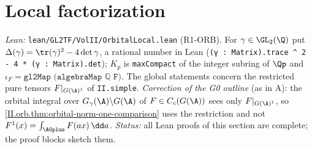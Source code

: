 \section{Local factorization}\label{sec:orb-local}

\noindent\emph{Lean:} \texttt{lean/GL2TF/VolII/OrbitalLocal.lean} (R1-ORB). For $\gamma\in\GL_2(\Q)$ put $\Delta(\gamma)=\tr(\gamma)^2-4\det\gamma$, a rational number in Lean (\texttt{(γ : Matrix).trace \^{} 2 - 4 * (γ : Matrix).det}); $K_p$ is \texttt{maxCompact} of the integer subring of $\Qp$ and $\iota_F=\texttt{gl2Map (algebraMap ℚ F)}$. The global statements concern the restricted pure tensors $F|_{G(\A)^1}$ of \texttt{II.simple}. \emph{Correction of the G0 outline} (as in A): the orbital integral over $G_\gamma(\A)\backslash G(\A)$ of $F\in C_c(G(\A))$ sees only $F|_{G(\A)^1}$, so \cref{II.orb.thm:orbital-norm-one-comparison} uses the restriction and not $F^1(x)=\int_{\AGplus}F(ax)\,\dd a$. \emph{Status:} all Lean proofs of this section are complete; the proof blocks sketch them.

